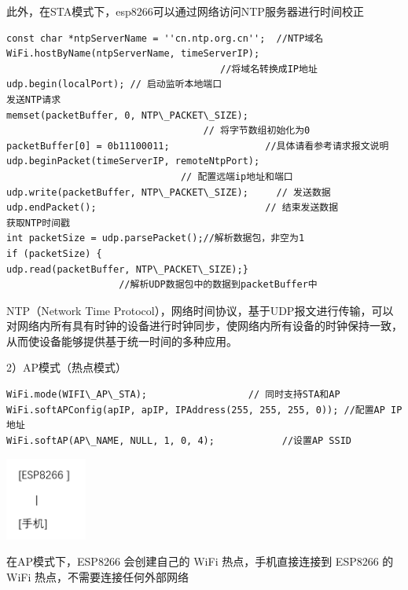 \documentclass[16pt]{beamer}	%
\begin{document}
	    \begin{frame}[fragile]
	  \small  此外，在STA模式下，esp8266可以通过网络访问NTP服务器进行时间校正
	\begin{lstlisting}
const char *ntpServerName = ''cn.ntp.org.cn'';  //NTP域名
WiFi.hostByName(ntpServerName, timeServerIP);
                                      //将域名转换成IP地址
udp.begin(localPort); // 启动监听本地端口
发送NTP请求
memset(packetBuffer, 0, NTP\_PACKET\_SIZE); 
                                   // 将字节数组初始化为0
packetBuffer[0] = 0b11100011;                 //具体请看参考请求报文说明
udp.beginPacket(timeServerIP, remoteNtpPort); 
                               // 配置远端ip地址和端口
udp.write(packetBuffer, NTP\_PACKET\_SIZE);     // 发送数据
udp.endPacket();                              // 结束发送数据
获取NTP时间戳
int packetSize = udp.parsePacket();//解析数据包，非空为1
if (packetSize) {
udp.read(packetBuffer, NTP\_PACKET\_SIZE);}
                    //解析UDP数据包中的数据到packetBuffer中
\end{lstlisting}
\small NTP（Network Time Protocol），网络时间协议，基于UDP报文进行传输，可以对网络内所有具有时钟的设备进行时钟同步，使网络内所有设备的时钟保持一致，从而使设备能够提供基于统一时间的多种应用。
	  \end{frame}
	    \begin{frame}[fragile]
	  	\small  2）AP模式（热点模式）
	  	\begin{lstlisting}
WiFi.mode(WIFI\_AP\_STA);                  // 同时支持STA和AP
WiFi.softAPConfig(apIP, apIP, IPAddress(255, 255, 255, 0)); //配置AP IP地址
WiFi.softAP(AP\_NAME, NULL, 1, 0, 4);            //设置AP SSID  
\end{lstlisting}
	\centering \includegraphics[width=0.2\textwidth]{pic/2-4.png}
	 \begin{flushleft} \small 在AP模式下，ESP8266 会创建自己的 WiFi 热点，手机直接连接到 ESP8266 的 WiFi 热点，不需要连接任何外部网络
	 \end{flushleft}
	 \end{frame}
\end{document}
